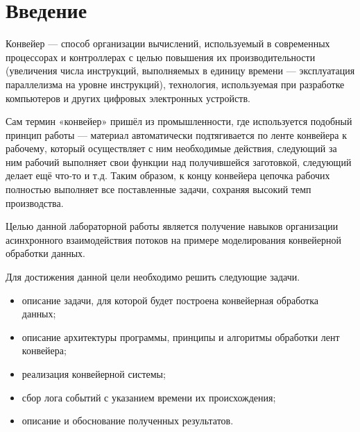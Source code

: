 \chapter*{\hfill{\centering Введение}\hfill}


Конвейер — способ организации вычислений, используемый в современных процессорах и контроллерах с целью повышения их производительности (увеличения числа инструкций, выполняемых в единицу времени — эксплуатация параллелизма на уровне инструкций), технология, используемая при разработке компьютеров и других цифровых электронных устройств.

Сам термин «конвейер» пришёл из промышленности, где используется подобный принцип работы — материал автоматически подтягивается по ленте конвейера к рабочему, который осуществляет с ним необходимые действия, следующий за ним рабочий выполняет свои функции над получившейся заготовкой, следующий делает ещё что-то и т.д. 
Таким образом, к концу конвейера цепочка рабочих полностью выполняет все поставленные задачи, сохраняя высокий темп производства. 

Целью данной лабораторной работы является получение навыков организации асинхронного взаимодействия потоков на примере моделирования конвейерной обработки данных.

Для достижения данной цели необходимо решить следующие задачи.

\begin{itemize} [label=---]
	\item описание задачи, для которой будет построена конвейерная обработка данных;
	\item описание архитектуры программы, принципы и алгоритмы обработки лент конвейера;
	\item реализация конвейерной системы;
	\item сбор лога событий с указанием времени их происхождения; 
	\item описание и обоснование полученных результатов.
\end{itemize}


